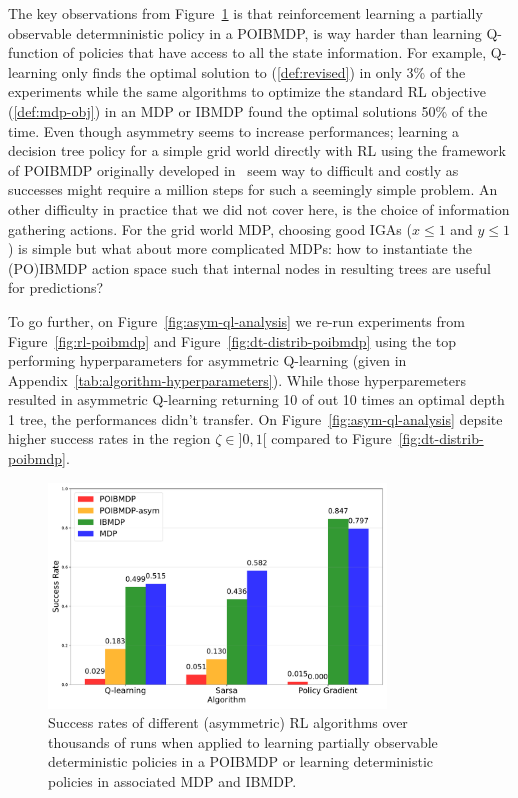 The key observations from Figure~\ref{fig:po-vs-ib} is that reinforcement learning a partially observable determninistic policy in a POIBMDP, is way harder than learning Q-function of policies that have access to all the state information.
For example, Q-learning only finds the optimal solution to (\ref{def:revised}) in only 3\% of the experiments while the same algorithms to optimize the standard RL objective (\ref{def:mdp-obj}) in an MDP or IBMDP found the optimal solutions 50\% of the time.
Even though asymmetry seems to increase performances; learning a decision tree policy for a simple grid world directly with RL using the framework of POIBMDP originally developed in~\cite{topin2021iterative} seem way to difficult and costly as successes might require a million steps for such a seemingly simple problem.
An other difficulty in practice that we did not cover here, is the choice of information gathering actions.
For the grid world MDP, choosing good IGAs ($x\leq1$ and $y\leq1$) is simple but what about more complicated MDPs: how to instantiate the (PO)IBMDP action space such that internal nodes in resulting trees are useful for predictions?

To go further, on Figure~\ref{fig:asym-ql-analysis} we re-run experiments from Figure~\ref{fig:rl-poibmdp} and Figure~\ref{fig:dt-distrib-poibmdp} using the top performing hyperparameters for asymmetric Q-learning (given in Appendix~\ref{tab:algorithm-hyperparameters}).
While those hyperparemeters resulted in asymmetric Q-learning returning 10 of out 10 times an optimal depth 1 tree,
the performances didn't transfer.
On Figure~\ref{fig:asym-ql-analysis} depsite higher success rates in the region $\zeta\in]0,1[$ compared to Figure~\ref{fig:dt-distrib-poibmdp}. 

\begin{figure}
    \centering
    \includegraphics[width=0.8\textwidth]{images/images_part1/algorithm_performance_comparison_flattened.pdf}
    \caption{Success rates of different (asymmetric) RL algorithms over thousands of runs when applied to learning partially observable deterministic policies in a POIBMDP or learning deterministic policies in associated MDP and IBMDP.}\label{fig:po-vs-ib}
\end{figure}


